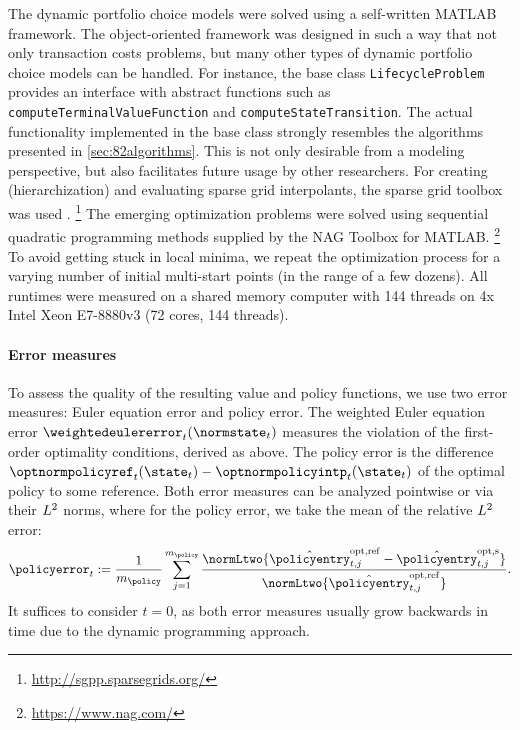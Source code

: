 The dynamic portfolio choice models were solved using a self-written
MATLAB framework.
The object-oriented framework was designed in such a way that
not only transaction costs problems,
but many other types of dynamic portfolio choice models can be handled.
For instance, the base class \texttt{LifecycleProblem} provides
an interface with abstract functions such as
\texttt{computeTerminalValueFunction} and
\texttt{computeStateTransition}.
The actual functionality implemented in the base class strongly resembles
the algorithms presented in \cref{sec:82algorithms}.
This is not only desirable from a modeling perspective,
but also facilitates future usage by other researchers.
For creating (hierarchization) and evaluating sparse grid interpolants,
the sparse grid toolbox \sgpp was used \cite{Pflueger10Spatially}.%
\footnote{%
  \url{http://sgpp.sparsegrids.org/}%
}
The emerging optimization problems were solved using
sequential quadratic programming methods supplied by the
NAG Toolbox for MATLAB.%
\footnote{%
  \url{https://www.nag.com/}%
}
To avoid getting stuck in local minima,
we repeat the optimization process for a varying number
of initial multi-start points (in the range of a few dozens).
All runtimes were measured on a shared memory computer
with 144 threads on 4x Intel Xeon E7-8880v3 (72 cores, 144 threads).

\paragraph{Error measures}

To assess the quality of the resulting value and policy functions,
we use two error measures:
Euler equation error and policy error.
The weighted Euler equation error $\weightedeulererror_t(\normstate_t)$
measures the violation of the first-order optimality conditions,
derived as above.
The policy error is the difference
$\optnormpolicyref_t(\state_t) - \optnormpolicyintp_t(\state_t)$
of the optimal policy to some reference.
Both error measures can be analyzed pointwise or
via their $L^2$ norms, where for the policy error,
we take the mean of the relative $L^2$ error:
\begin{equation}
  \policyerror_t
  := \frac{1}{m_{\policy}} \sum_{j=1}^{m_{\policy}}
  \frac{
    \normLtwo{\optnormpolicyentryref_{t,j} - \optnormpolicyentryintp_{t,j}}
  }{
    \normLtwo{\optnormpolicyentryref_{t,j}}
  }.
\end{equation}
It suffices to consider $t = 0$, as both error measures
usually grow backwards in time due to the dynamic programming approach.



